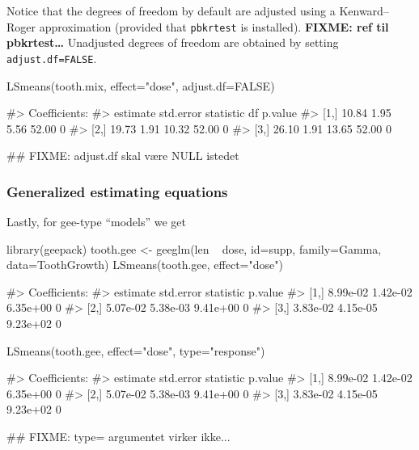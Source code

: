 Notice that the degrees of freedom by default are adjusted using a
Kenward--Roger approximation (provided that \texttt{pbkrtest} is
installed). \textbf{FIXME: ref til pbkrtest\ldots{}} Unadjusted degrees
of freedom are obtained by setting \verb|adjust.df=FALSE|.

\begin{Schunk}
\begin{Sinput}
LSmeans(tooth.mix, effect="dose", adjust.df=FALSE)
\end{Sinput}
\begin{Soutput}
#> Coefficients:
#>      estimate std.error statistic    df p.value
#> [1,]    10.84      1.95      5.56 52.00       0
#> [2,]    19.73      1.91     10.32 52.00       0
#> [3,]    26.10      1.91     13.65 52.00       0
\end{Soutput}
\begin{Sinput}
## FIXME: adjust.df skal være NULL istedet
\end{Sinput}
\end{Schunk}

\hypertarget{generalized-estimating-equations}{%
\subsubsection{Generalized estimating
equations}\label{generalized-estimating-equations}}

Lastly, for gee-type ``models'' we get

\begin{Schunk}
\begin{Sinput}
library(geepack)
tooth.gee <- geeglm(len ~ dose, id=supp, family=Gamma, data=ToothGrowth)
LSmeans(tooth.gee, effect="dose")
\end{Sinput}
\begin{Soutput}
#> Coefficients:
#>      estimate std.error statistic p.value
#> [1,] 8.99e-02  1.42e-02  6.35e+00       0
#> [2,] 5.07e-02  5.38e-03  9.41e+00       0
#> [3,] 3.83e-02  4.15e-05  9.23e+02       0
\end{Soutput}
\begin{Sinput}
LSmeans(tooth.gee, effect="dose", type="response")
\end{Sinput}
\begin{Soutput}
#> Coefficients:
#>      estimate std.error statistic p.value
#> [1,] 8.99e-02  1.42e-02  6.35e+00       0
#> [2,] 5.07e-02  5.38e-03  9.41e+00       0
#> [3,] 3.83e-02  4.15e-05  9.23e+02       0
\end{Soutput}
\begin{Sinput}
## FIXME: type= argumentet virker ikke...
\end{Sinput}
\end{Schunk}

